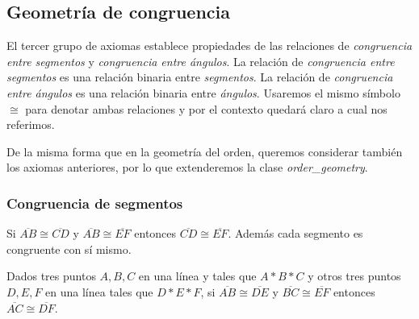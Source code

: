 \subsection{Geometría de congruencia}


El tercer grupo de axiomas establece propiedades de las relaciones de
\textit{congruencia entre segmentos} y \textit{congruencia entre ángulos}. La
relación de \textit{congruencia entre segmentos} es una relación binaria entre
\textit{segmentos}. La relación de \textit{congruencia entre ángulos} es una relación binaria entre
\textit{ángulos}. Usaremos el mismo símbolo $\cong$ para denotar ambas
relaciones y por el contexto quedará claro a cual nos referimos.

De la misma forma que en la geometría del orden, queremos considerar también los
axiomas anteriores, por lo que extenderemos la clase \textit{order_geometry}.



\subsubsection{Congruencia de segmentos}

\begin{ax}\label{C1}
\end{ax}


\begin{ax}\label{C2}
	Si $\overline{AB}\cong\overline{CD}$ y $\overline{AB}\cong\overline{EF}$
	entonces $\overline{CD}\cong\overline{EF}$. Además cada segmento es
	congruente con sí mismo.
\end{ax}


\begin{ax}[Suma]\label{C3}
	Dados tres puntos $A, B, C$ en una línea y tales que $A * B * C$ y otros
	tres puntos $D, E, F$ en una línea tales que $D * E * F$, si
	$\overline{AB}\cong\overline{DE}$ y $\overline{BC}\cong\overline{EF}$
	entonces $\overline{AC}\cong\overline{DF}$.
\end{ax}


